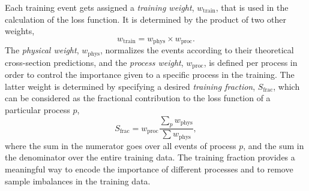Each training event gets assigned a \emph{training weight}, $w_\text{train}$, that is used in the calculation of the loss function. It is determined by the product of two other weights,
\begin{equation}
    w_\text{train} = w_\text{phys} \times w_\text{proc}.
\end{equation}
The \emph{physical weight}, $w_\text{phys}$, normalizes the events according to their theoretical cross-section predictions, and the \emph{process weight}, $w_\text{proc}$, is defined per process in order to control the importance given to a specific process in the training.
The latter weight is determined by specifying a desired \emph{training fraction}, $S_\text{frac}$, which can be considered as the fractional contribution to the loss function of a particular process $p$,
\begin{equation}
    S_\text{frac} = w_\text{proc} \frac{\sum_{p} w_\text{phys}}{ \sum w_\text{phys}},
\end{equation}
where the sum in the numerator goes over all events of process $p$, and the sum in the denominator over the entire training data. The training fraction provides a meaningful way to encode the importance of different processes and to remove sample imbalances in the training data. 

